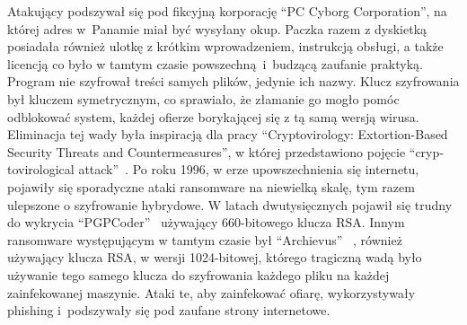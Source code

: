 Atakujący podszywał się pod fikcyjną korporację \foreignquote{english}{PC Cyborg Corporation}, na której adres w~Panamie miał być wysyłany okup. Paczka razem z dyskietką posiadała również ulotkę z krótkim wprowadzeniem, instrukcją obsługi, a także licencją co było w tamtym czasie powszechną~i~budzącą zaufanie praktyką. 
Program nie szyfrował treści samych plików, jedynie ich nazwy. Klucz szyfrowania był kluczem symetrycznym, co sprawiało, że złamanie go mogło pomóc odblokować system, każdej ofierze borykającej się z tą samą wersją wirusa. Eliminacja tej wady była inspiracją dla pracy \foreignquote{english}{Cryptovirology: Extortion-Based Security Threats and Countermeasures}, w której przedstawiono pojęcie \foreignquote{english}{cryptovirological attack}~\cite{yung}.
\newline
Po roku 1996, w erze upowszechnienia się internetu, pojawiły się sporadyczne ataki ransomware na niewielką skalę, tym razem ulepszone o szyfrowanie hybrydowe. W latach dwutysięcznych pojawił się trudny do wykrycia \foreignquote{english}{PGPCoder}~\cite{tromer_cryptanalysis_nodate} używający 660-bitowego klucza RSA. Innym ransomware występującym w tamtym czasie był \foreignquote{english}{Archievus} ~\cite{arhiveus}, również używający klucza RSA, w wersji 1024-bitowej, którego tragiczną wadą było używanie tego samego klucza do szyfrowania każdego pliku na każdej zainfekowanej maszynie. Ataki te, aby zainfekować ofiarę, wykorzystywały phishing i~podszywały się pod zaufane strony internetowe. 
